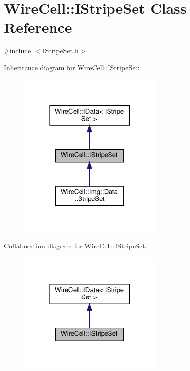 \hypertarget{class_wire_cell_1_1_i_stripe_set}{}\section{Wire\+Cell\+:\+:I\+Stripe\+Set Class Reference}
\label{class_wire_cell_1_1_i_stripe_set}


{\ttfamily \#include $<$I\+Stripe\+Set.\+h$>$}



Inheritance diagram for Wire\+Cell\+:\+:I\+Stripe\+Set\+:
\nopagebreak
\begin{figure}[H]
\begin{center}
\leavevmode
\includegraphics[width=202pt]{class_wire_cell_1_1_i_stripe_set__inherit__graph}
\end{center}
\end{figure}


Collaboration diagram for Wire\+Cell\+:\+:I\+Stripe\+Set\+:
\nopagebreak
\begin{figure}[H]
\begin{center}
\leavevmode
\includegraphics[width=202pt]{class_wire_cell_1_1_i_stripe_set__coll__graph}
\end{center}
\end{figure}
